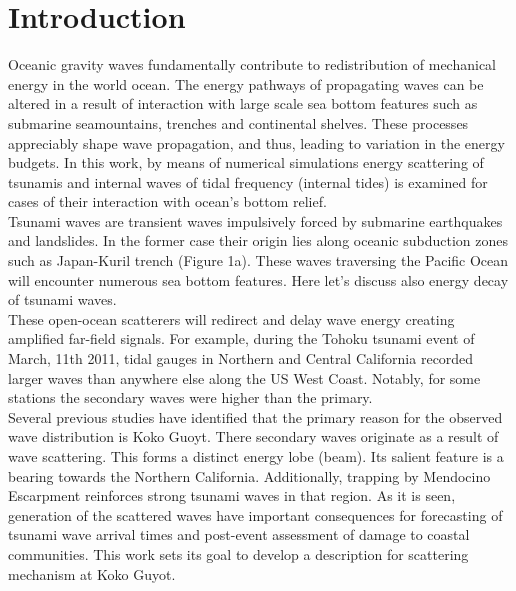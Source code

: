 \newpage
\section{Introduction}
Oceanic gravity waves fundamentally contribute to redistribution of mechanical energy in the world ocean. The energy pathways of propagating waves can be altered in a result of interaction with large scale sea bottom features such as submarine seamountains, trenches and continental shelves. These processes appreciably shape wave propagation, and thus, leading to variation in the energy budgets. In this work, by means of numerical simulations  energy scattering of tsunamis and internal waves of tidal frequency (internal tides) is examined for cases of their interaction with ocean's bottom relief.\\
Tsunami waves are transient waves impulsively forced by submarine earthquakes and landslides. In the former case their origin lies along oceanic subduction zones such as Japan-Kuril trench (Figure 1a). These waves traversing the Pacific Ocean will encounter numerous sea bottom features. Here let's discuss also energy decay of tsunami waves.\\
These open-ocean scatterers will redirect and delay wave energy creating amplified far-field signals. For example, during the Tohoku tsunami event of March, 11th 2011, tidal gauges in Northern and Central California recorded larger waves than anywhere else along the US West Coast. Notably, for some stations the secondary waves were higher than the primary.\\
Several previous studies have identified that the primary reason for the observed wave distribution is Koko Guoyt. There secondary waves originate as a result of wave scattering. This forms a distinct energy lobe (beam). Its salient feature is a bearing towards the Northern California. Additionally, trapping by Mendocino Escarpment reinforces strong tsunami waves in that region.  As it is seen, generation of the scattered waves have important consequences for forecasting of tsunami wave arrival times and post-event assessment of damage to coastal communities. This work sets its goal to develop a description for scattering mechanism at Koko Guyot.\\

